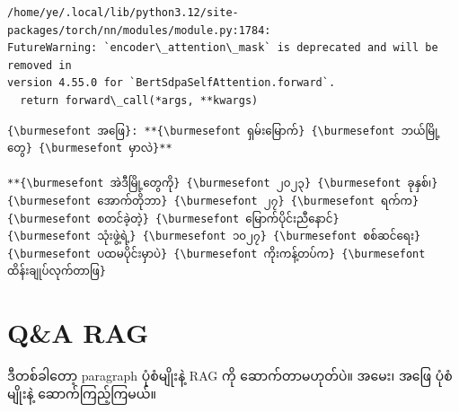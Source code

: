 \documentclass[11pt]{article}
\begin{document}
    \begin{Verbatim}[commandchars=\\\{\}]
/home/ye/.local/lib/python3.12/site-packages/torch/nn/modules/module.py:1784:
FutureWarning: `encoder\_attention\_mask` is deprecated and will be removed in
version 4.55.0 for `BertSdpaSelfAttention.forward`.
  return forward\_call(*args, **kwargs)
    \end{Verbatim}

    \begin{Verbatim}[commandchars=\\\{\}]
{\burmesefont အဖြေ}: **{\burmesefont ရှမ်းမြောက်} {\burmesefont ဘယ်မြို့တွေ} {\burmesefont မှာလဲ}**

**{\burmesefont အဲဒီမြို့တွေကို} {\burmesefont ၂၀၂၃} {\burmesefont ခုနှစ်၊} {\burmesefont အောက်တိုဘာ} {\burmesefont ၂၇} {\burmesefont ရက်က} {\burmesefont စတင်ခဲ့တဲ့} {\burmesefont မြောက်ပိုင်းညီနောင်}
{\burmesefont သုံးဖွဲ့ရဲ့} {\burmesefont ၁၀၂၇} {\burmesefont စစ်ဆင်ရေး} {\burmesefont ပထမပိုင်းမှာပဲ} {\burmesefont ကိုးကန့်တပ်က} {\burmesefont ထိန်းချုပ်လုက်တာဖြ}
    \end{Verbatim}

    \hypertarget{qa-rag}{%
\section{Q\&A RAG}\label{qa-rag}}

{\burmesefont ဒီတစ်ခါတော့} paragraph {\burmesefont ပုံစံမျိုးနဲ့} RAG {\burmesefont ကို} {\burmesefont ဆောက်တာမဟုတ်ပဲ။} {\burmesefont အမေး၊} {\burmesefont အဖြေ} {\burmesefont ပုံစံမျိုးနဲ့}
{\burmesefont ဆောက်ကြည့်ကြမယ်။}
\end{document}

